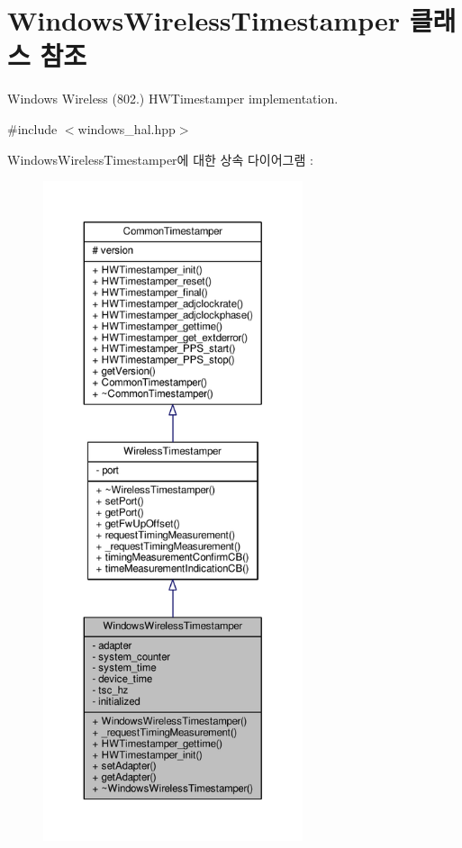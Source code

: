 \hypertarget{class_windows_wireless_timestamper}{}\section{Windows\+Wireless\+Timestamper 클래스 참조}
\label{class_windows_wireless_timestamper}


Windows Wireless (802.) H\+W\+Timestamper implementation.  




{\ttfamily \#include $<$windows\+\_\+hal.\+hpp$>$}



Windows\+Wireless\+Timestamper에 대한 상속 다이어그램 \+: 
\nopagebreak
\begin{figure}[H]
\begin{center}
\leavevmode
\includegraphics[height=550pt]{class_windows_wireless_timestamper__inherit__graph}
\end{center}
\end{figure}


